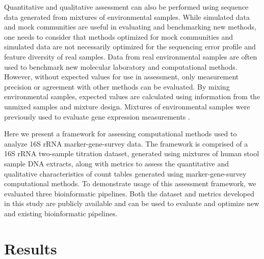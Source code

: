 \documentclass[linenumbers]{bmcart}
\begin{document}
Quantitative and qualitative assessment can also be performed using
sequence data generated from mixtures of environmental samples. While
simulated data and mock communities are useful in evaluating and
benchmarking new methods, one needs to consider that methods optimized
for mock communities and simulated data are not necessarily optimized
for the sequencing error profile and feature diversity of real samples.
Data from real environmental samples are often used
to benchmark new molecular laboratory and computational methods.
However, without expected values for use in assessment, only measurement
precision or agreement with other methods can be evaluated. By mixing
environmental samples, expected values are calculated using information
from the unmixed samples and mixture design. Mixtures of environmental
samples were previously used to evaluate gene expression measurements
\cite{parsons2015using, pine2011adaptable, thompson2005use}.


Here we present a framework for assessing computational methods used to
analyze 16S rRNA marker-gene-survey data. The framework is comprised of a 16S rRNA
two-sample titration dataset,  generated using mixtures of human stool sample DNA extracts, along with metrics to assess the quantitative and qualitative characteristics of count tables generated using marker-gene-survey computational methods.
To demonstrate usage of this assessment framework, we evaluated three bioinformatic pipelines.
Both the dataset and metrics developed in this study are publicly available and can be used to evaluate and optimize
new and existing bioinformatic pipelines.


\section*{Results}
\end{document}
